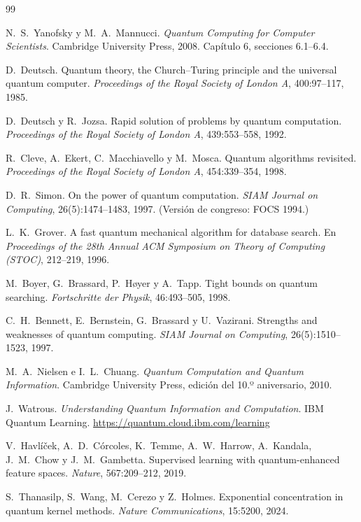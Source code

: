 \documentclass[11pt, a4paper, twoside, openright]{report}
\begin{document}
\cleardoublepage
\begin{thebibliography}{99}

N.~S.~Yanofsky y M.~A.~Mannucci.
\newblock \emph{Quantum Computing for Computer Scientists}.
\newblock Cambridge University Press, 2008. Capítulo 6, secciones 6.1--6.4.

D.~Deutsch.
\newblock Quantum theory, the Church--Turing principle and the universal quantum computer.
\newblock \emph{Proceedings of the Royal Society of London A}, 400:97--117, 1985.

D.~Deutsch y R.~Jozsa.
\newblock Rapid solution of problems by quantum computation.
\newblock \emph{Proceedings of the Royal Society of London A}, 439:553--558, 1992.

R.~Cleve, A.~Ekert, C.~Macchiavello y M.~Mosca.
\newblock Quantum algorithms revisited.
\newblock \emph{Proceedings of the Royal Society of London A}, 454:339--354, 1998.

D.~R.~Simon.
\newblock On the power of quantum computation.
\newblock \emph{SIAM Journal on Computing}, 26(5):1474--1483, 1997. (Versión de congreso: FOCS 1994.)

L.~K.~Grover.
\newblock A fast quantum mechanical algorithm for database search.
\newblock En \emph{Proceedings of the 28th Annual ACM Symposium on Theory of Computing (STOC)}, 212--219, 1996.

M.~Boyer, G.~Brassard, P.~Høyer y A.~Tapp.
\newblock Tight bounds on quantum searching.
\newblock \emph{Fortschritte der Physik}, 46:493--505, 1998.

C.~H.~Bennett, E.~Bernstein, G.~Brassard y U.~Vazirani.
\newblock Strengths and weaknesses of quantum computing.
\newblock \emph{SIAM Journal on Computing}, 26(5):1510--1523, 1997.

M.~A.~Nielsen e I.~L.~Chuang.
\newblock \emph{Quantum Computation and Quantum Information}.
\newblock Cambridge University Press, edición del 10.º aniversario, 2010.

J.~Watrous.
\newblock \emph{Understanding Quantum Information and Computation}.
\newblock IBM Quantum Learning.
\newblock \url{https://quantum.cloud.ibm.com/learning}

V.~Havlíček, A.~D.~Córcoles, K.~Temme, A.~W.~Harrow, A.~Kandala, J.~M.~Chow y J.~M.~Gambetta.
\newblock Supervised learning with quantum-enhanced feature spaces.
\newblock \emph{Nature}, 567:209--212, 2019.

S.~Thanasilp, S.~Wang, M.~Cerezo y Z.~Holmes.
\newblock Exponential concentration in quantum kernel methods.
\newblock \emph{Nature Communications}, 15:5200, 2024.

\end{thebibliography}
\end{document}
